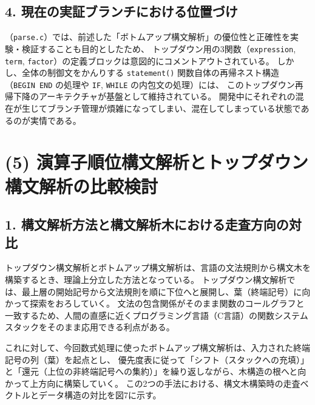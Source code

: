 \documentclass[11pt,a4paper,dvipdfmx]{bxjsarticle}
\begin{document}
\subsection*{4. 現在の実証ブランチにおける位置づけ}
（\texttt{parse.c}）では、前述した「ボトムアップ構文解析」の優位性と正確性を実験・検証することも目的としたため、
トップダウン用の3関数（\texttt{expression}, \texttt{term}, \texttt{factor}）の定義ブロックは意図的にコメントアウトされている。
しかし、全体の制御文をかんりする \texttt{statement()} 関数自体の再帰ネスト構造（\texttt{BEGIN~END} の処理や \texttt{IF}, \texttt{WHILE} の内包文の処理）には、
このトップダウン再帰下降のアーキテクチャが基盤として維持されている。
開発中にそれぞれの混在が生じてブランチ管理が煩雑になってしまい、混在してしまっている状態であるのが実情である。

\section*{(5) 演算子順位構文解析とトップダウン構文解析の比較検討}

\subsection*{1. 構文解析方法と構文解析木における走査方向の対比}
トップダウン構文解析とボトムアップ構文解析は、言語の文法規則から構文木を構築するとき、理論上分立した方法となっている。
トップダウン構文解析では、最上層の開始記号から文法規則を順に下位へと展開し、葉（終端記号）に向かって探索をおろしていく。
文法の包含関係がそのまま関数のコールグラフと一致するため、人間の直感に近くプログラミング言語（C言語）の関数システムスタックをそのまま応用できる利点がある。

これに対して、今回数式処理に使ったボトムアップ構文解析は、入力された終端記号の列（葉）を起点とし、
優先度表に従って「シフト（スタックへの充填）」と「還元（上位の非終端記号への集約）」を繰り返しながら、木構造の根へと向かって上方向に構築していく。
この2つの手法における、構文木構築時の走査ベクトルとデータ構造の対比を図7に示す。
\end{document}
